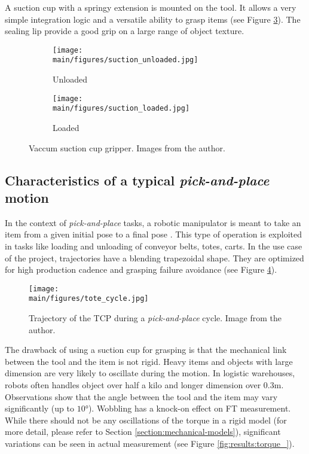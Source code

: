 \documentclass[/home/francois/latex/report/main.tex]{subfiles}
\begin{document}
A suction cup with a springy extension is mounted on the tool. It allows a very simple integration logic and a versatile ability to grasp items (see Figure \ref{fig:background:suction}). The sealing lip provide a good grip on a large range of object texture.

\begin{figure}
\centering
\begin{subfigure}{0.49\textwidth}
\centering
\texttt{[image: \\main/figures/suction\_unloaded.jpg]}
\caption{Unloaded}
\label{fig:background:suction-unloaded}
\end{subfigure}
\begin{subfigure}{0.49\textwidth}
\centering
\texttt{[image: \\main/figures/suction\_loaded.jpg]}
\caption{Loaded}
\label{fig:background:suction-loaded}
\end{subfigure}
\caption{Vaccum suction cup gripper. Images from the author.}
\label{fig:background:suction}
\end{figure}

\subsection{Characteristics of a typical \textit{pick-and-place} motion}

In the context of \textit{pick-and-place} tasks, a robotic manipulator is meant to
take an item from a given initial pose to a final pose \cite{Angeles2006}. This type of operation is exploited in tasks like loading and unloading of conveyor belts, totes, carts. In the use case of the project, trajectories have a blending trapezoidal shape. They are optimized for high production cadence and grasping failure avoidance (see Figure \ref{fig:background:tote_cycle}).

\begin{figure}[H]
  \centering
  \texttt{[image: \\main/figures/tote\_cycle.jpg]}
  \caption{Trajectory of the \ac{TCP} during a \textit{pick-and-place} cycle. Image from the author.}
  \label{fig:background:tote_cycle}
\end{figure}

The drawback of using a suction cup for grasping is that the mechanical link between the tool and the item is not rigid. Heavy items and objects with large dimension are very likely to oscillate during the motion. In logistic warehouses, robots often handles object over half a kilo and longer dimension over $0.3 \si{\meter}$. Observations show that the angle between the tool and the item may vary significantly (up to $10 \si{\degree}$). Wobbling has a knock-on effect on \ac{FT} measurement. While there should not be any oscillations of the torque in a rigid model (for more detail, please refer to Section \ref{section:mechanical-models}), significant variations can be seen in actual measurement (see Figure \ref{fig:results:torque_}).
\end{document}
